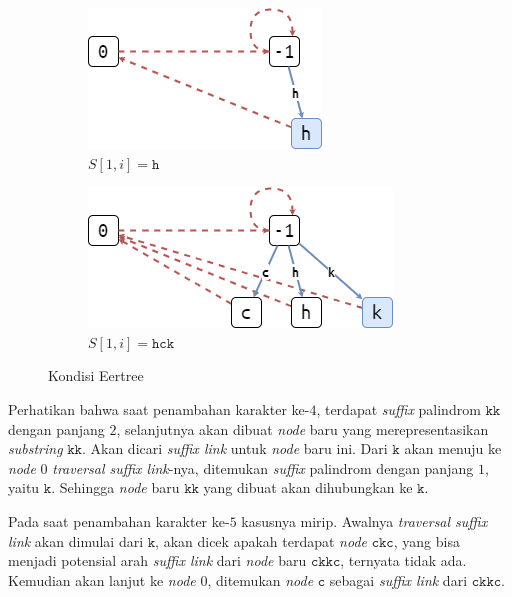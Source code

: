 \documentclass[11pt, a4paper, final]{article}
\begin{document}
\begin{figure}[H]
\centering
\begin{subfigure}[b]{0.4\textwidth}
\includegraphics[scale=0.5]{assets/eer02.png}
\caption{$S[1, i] = \texttt{h}$}
\end{subfigure}
\begin{subfigure}[b]{0.4\textwidth}
\includegraphics[scale=0.5]{assets/eer03.png}
\caption{$S[1, i] = \texttt{hck}$}
\end{subfigure}
\caption{Kondisi Eertree}
\end{figure}

Perhatikan bahwa saat penambahan karakter ke-$4$, terdapat \textit{suffix} palindrom $\texttt{kk}$ dengan panjang $2$, selanjutnya akan dibuat \textit{node} baru yang merepresentasikan \textit{substring} $\texttt{kk}$. Akan dicari \textit{suffix link} untuk \textit{node} baru ini. Dari $\texttt{k}$ akan menuju ke \textit{node} $0$ \textit{traversal suffix link}-nya, ditemukan \textit{suffix} palindrom dengan panjang $1$, yaitu $\texttt{k}$. Sehingga \textit{node} baru $\texttt{kk}$ yang dibuat akan dihubungkan ke $\texttt{k}$.

Pada saat penambahan karakter ke-$5$ kasusnya mirip. Awalnya \textit{traversal suffix link} akan dimulai dari $\texttt{k}$, akan dicek apakah terdapat \textit{node} $\texttt{ckc}$, yang bisa menjadi potensial arah \textit{suffix link} dari \textit{node} baru $\texttt{ckkc}$, ternyata tidak ada. Kemudian akan lanjut ke \textit{node} $0$, ditemukan \textit{node} $\texttt{c}$ sebagai \textit{suffix link} dari $\texttt{ckkc}$.
\end{document}
